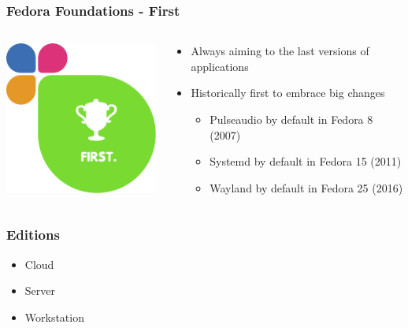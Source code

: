 \documentclass[t,aspectratio=169]{beamer}
\begin{document}
\begin{frame}
    \frametitle{Fedora Foundations - First}
    \begin{columns}[T] %
        \begin{column}{.5\textwidth}
            \hfill\includegraphics[height=0.6\textheight]{foundations_expand_4_first.pdf}
        \end{column}
        \begin{column}{.5\textwidth}
            \begin{itemize}
                \item<2-> Always aiming to the last versions of applications
                \item<3-> Historically first to embrace big changes
                \begin{itemize}
                    \item<4-> Pulseaudio by default in Fedora 8 (2007)
                    \item<5-> Systemd by default in Fedora 15 (2011)
                    \item<6-> Wayland by default in Fedora 25 (2016)
                \end{itemize}
            \end{itemize}
        \end{column}
    \end{columns}
\end{frame}

\begin{frame}
    \frametitle{Editions}
    \begin{itemize}
        \item<2-> Cloud
        \item<3-> Server
        \item<4-> Workstation
    \end{itemize}
\end{frame}
\end{document}
